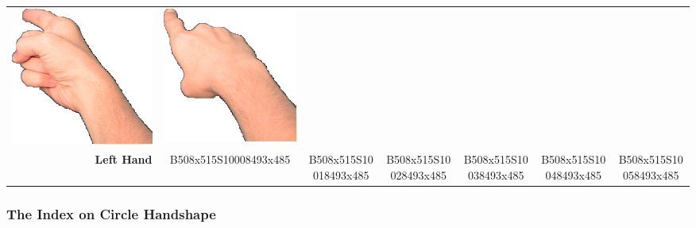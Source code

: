 \documentclass{article}
\begin{document}
\begin{center}
\begin{tabular}{r*{6}{c}}
\includegraphics[scale=0.1]{images/01-01-5.jpg}&
\includegraphics[scale=0.1]{images/01-01-6.jpg}\\
\textbf{Left Hand}&
B508x515S10008493x485&
B508x515S10018493x485&
B508x515S10028493x485&
B508x515S10038493x485&
B508x515S10048493x485&
B508x515S10058493x485\\
\end{tabular}
\end{center}

\subsubsection{The Index on Circle Handshape}
\end{document}
